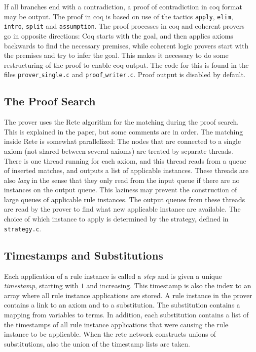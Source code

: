 \documentclass[a4paper]{article}
\begin{document}
If all branches end with a contradiction, a proof of contradiction in coq format may be output. The proof in coq is based on use of the tactics \verb|apply|, \verb|elim|, \verb|intro|, \verb|split| and \verb|assumption|. The proof processes in coq and coherent provers go in opposite directions: Coq starts with the goal, and then applies axioms backwards to find the necessary premises, while coherent logic provers start with the premises and try to infer the goal. This makes it necessary to do some restructuring of the proof to enable coq output. The code for this is found in the files \verb|prover|\underline{ }\verb|single.c| and \verb|proof|\underline{ }\verb|writer.c|. Proof output is disabled by default.

\subsection{The Proof Search}
The prover uses the Rete algorithm for the matching during the proof search. This is explained in the paper, but some comments are in order. The matching inside Rete is somewhat parallelized: The nodes that are connected to a single axiom (not shared between several axioms) are treated by separate threads. There is one thread running for each axiom, and this thread reads from a queue of inserted matches, and outputs a list of applicable instances. These threads are also \emph{lazy} in the sense that they only read from the input queue if there are no instances on the output queue. This laziness may prevent the construction of large queues of applicable rule instances. The output queues from these threads are read by the prover to find what new applicable instance are available. The choice of which instance to apply is determined by the strategy, defined in \verb|strategy.c|.

\subsection{Timestamps and Substitutions}
Each application of a rule instance is called a \emph{step} and is given a unique \emph{timestamp}, starting with $1$ and increasing. This timestamp is also the index to an array where all rule instance applications are stored. 
A rule instance in the prover contains a link to an axiom and to a substitution. The substitution contains a mapping from variables to terms. In addition, each substitution contains a list of the timestamps of all rule instance applications that were causing the rule instance to be applicable. When the rete network constructs unions of substitutions, also the union of the timestamp lists are taken.
\end{document}

